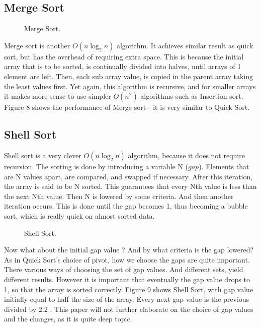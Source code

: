 \documentclass{acm_proc_article-sp}
\begin{document}
\subsection{Merge Sort}
\begin{figure}[!htb]
\caption{Merge Sort.}
\end{figure}
Merge sort is another  $O(n \log_2 n)$ algorithm. It achieves similar result as quick sort, but has the overhead of requiring extra space. This is because the initial array that is to be sorted, is continually divided into halves, until arrays of 1 element are left. Then, each sub array value, is copied in the parent array taking the least values first. Yet again, this algorithm is recursive, and for smaller arrays it makes more sense to use simpler $O(n^2)$ algorithms such as Insertion sort. Figure 8 shows the performance of Merge sort - it is very similar to Quick Sort.\\

\subsection{Shell Sort}
Shell sort is a very clever $O(n \log_2 n)$ algorithm, because it does not require recursion. The sorting is done by introducing a variable N ($gap$). Elements that are N values apart, are compared, and swapped if necessary. After this iteration, the array is said to be N sorted. This guarantees that every Nth value is less than the next Nth value.
Then N is lowered by some criteria. And then another iteration occurs. This is done until the gap becomes 1, thus becoming a bubble sort, which is really quick on almost sorted data. 
\begin{figure}[!htb]
\caption{Shell Sort.}
\end{figure}
Now what about the initial gap value ? And by what criteria is the gap lowered? As in Quick Sort's choice of pivot, how we choose the gaps are quite important. There various ways of choosing the set of gap values. And different sets, yield different results. However it is important that eventually the gap value drops to 1, so that the array is sorted correctly.  Figure 9 shows Shell Sort, with gap value initially equal to half the size of the array. Every next gap value is the previous divided by $2.2$ . This paper will not further elaborate on the choice of gap values and the changes, as it is quite deep topic.
\end{document}
